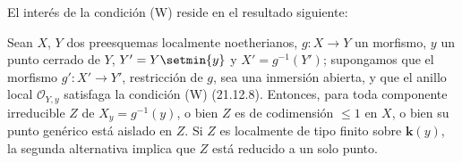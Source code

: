 El interés de la condición (W) reside en el resultado siguiente:

\begin{proposition}[21.12.10]
\label{IV.21.12.10}
Sean $X$, $Y$ dos preesquemas localmente noetherianos, $g:X\to Y$ un morfismo,
$y$ un punto cerrado de $Y$, $Y'=Y\setmin\{y\}$ y $X'=g^{-1}(Y')$; supongamos que el morfismo
$g':X'\to Y'$, restricción de $g$, sea una inmersión abierta, y que el anillo local
$\mathcal O_{Y,y}$ satisfaga la condición \textup{(W) (21.12.8)}. Entonces, para toda componente
irreducible $Z$ de $X_y=g^{-1}(y)$, \textup{o bien} $Z$ es de codimensión $\leq1$ en $X$,
\textup{o bien} su punto genérico está aislado en $Z$. Si $Z$ es localmente de tipo finito sobre
$\boldsymbol{k}(y)$, la segunda alternativa implica que $Z$ está reducido a un solo punto.
\end{proposition}

